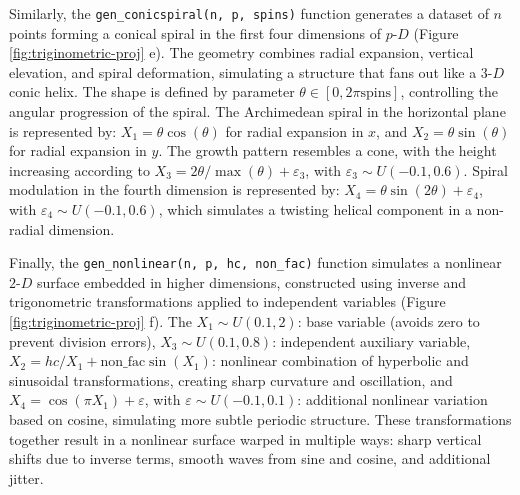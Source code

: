 Similarly, the \texttt{gen\_conicspiral(n,\ p,\ spins)} function generates a dataset of \(n\) points forming a conical spiral in the first four dimensions of \(p\text{-}D\) (Figure \ref{fig:triginometric-proj} e). The geometry combines radial expansion, vertical elevation, and spiral deformation, simulating a structure that fans out like a \(3\text{-}D\) conic helix. The shape is defined by parameter \(\theta \in [0, 2\pi\text{spins}]\), controlling the angular progression of the spiral. The Archimedean spiral in the horizontal plane is represented by: \(X_1 = \theta\cos(\theta)\) for radial expansion in \(x\), and \(X_2 = \theta\sin(\theta)\) for radial expansion in \(y\). The growth pattern resembles a cone, with the height increasing according to \(X_3 = 2\theta / \max(\theta) + \varepsilon_3\), with \(\varepsilon_3 \sim U(-0.1, 0.6).\) Spiral modulation in the fourth dimension is represented by: \(X_4 = \theta\sin(2\theta) + \varepsilon_4\), with \(\varepsilon_4 \sim U(-0.1, 0.6)\), which simulates a twisting helical component in a non-radial dimension.

Finally, the \texttt{gen\_nonlinear(n,\ p,\ hc,\ non\_fac)} function simulates a nonlinear \(2\text{-}D\) surface embedded in higher dimensions, constructed using inverse and trigonometric transformations applied to independent variables (Figure \ref{fig:triginometric-proj} f). The \(X_{1} \sim U(0.1, 2)\): base variable (avoids zero to prevent division errors), \(X_{3} \sim U(0.1, 0.8)\): independent auxiliary variable, \(X_{2} = hc/X_{1} + \text{non\_fac}\sin(X_{1})\): nonlinear combination of hyperbolic and sinusoidal transformations, creating sharp curvature and oscillation, and \(X_{4} = \cos(\pi X_{1}) + \varepsilon\), with \(\varepsilon \sim U(-0.1, 0.1)\): additional nonlinear variation based on cosine, simulating more subtle periodic structure. These transformations together result in a nonlinear surface warped in multiple ways: sharp vertical shifts due to inverse terms, smooth waves from sine and cosine, and additional jitter.


